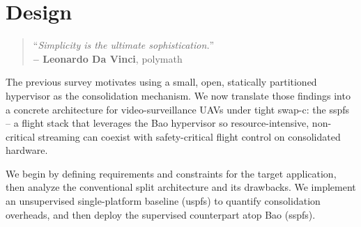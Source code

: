 %
\chapter{Design}%
\label{ch:design}
\begin{quote}
\begin{flushright}
``\emph{Simplicity is the ultimate sophistication.}'' \\
\textbf{-- Leonardo Da Vinci}, polymath
\end{flushright}
\end{quote}



The previous survey motivates using a small, open, statically partitioned
hypervisor as the consolidation mechanism. We now translate those findings into
a concrete architecture for video-surveillance UAVs under tight \gls{swap-c}:
the \gls{sspfs} -- a flight stack that leverages the Bao hypervisor so resource-intensive, non-critical streaming can coexist with safety-critical flight control on consolidated hardware.

We begin by defining requirements and constraints for the target application,
then analyze the conventional split architecture and its drawbacks. We implement
an unsupervised single-platform baseline (\gls{uspfs}) to quantify consolidation
overheads, and then deploy the supervised counterpart atop Bao (\gls{sspfs}).

